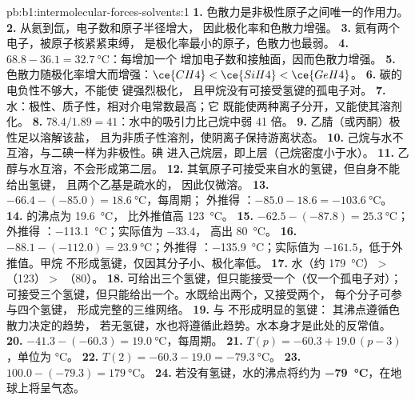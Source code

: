 \begin{solution}{pb:b1:intermolecular-forces-solvents:1}
\textbf{1.} 色散力是非极性原子之间唯一的作用力。
\textbf{2.} 从氦到氙，电子数和原子半径增大，
因此极化率和色散力增强。
\textbf{3.} 氦有两个电子，被原子核紧紧束缚，
是极化率最小的原子，色散力也最弱。
\textbf{4.} $68.8 - 36.1 = \qty{32.7}{\celsius}$：每增加一个 
增加电子数和接触面，因而色散力增强。
\textbf{5.} 色散力随极化率增大而增强：$\ce{CH4} < \ce{SiH4} <
\ce{GeH4}$。
\textbf{6.} 碳的电负性不够大，不能使  键强烈极化，
且甲烷没有可接受氢键的孤电子对。
\textbf{7.} 水：极性、质子性，相对介电常数最高；它
既能使两种离子分开，又能使其溶剂化。
\textbf{8.} $78.4/1.89 = 41$：水中的吸引力比己烷中弱 41 倍。
\textbf{9.} 乙腈（或丙酮）极性足以溶解该盐，
且为非质子性溶剂，使阴离子保持游离状态。
\textbf{10.} 己烷与水不互溶，与二碘一样为非极性。碘
进入己烷层，即上层（己烷密度小于水）。
\textbf{11.} 乙醇与水互溶，不会形成第二层。
\textbf{12.} 其氧原子可接受来自水的氢键，但自身不能给出氢键，
且两个乙基是疏水的，
因此仅微溶。
\textbf{13.} $-66.4 - (-85.0) = \qty{18.6}{\celsius}$，每周期；
外推得 ：$-85.0 - 18.6 = \qty{-103.6}{\celsius}$。
\textbf{14.}  的沸点为 \qty{19.6}{\celsius}，
比外推值高 \qty{123}{\celsius}。
\textbf{15.} $-62.5 - (-87.8) = \qty{25.3}{\celsius}$；外推得
：\qty{-113.1}{\celsius}；实际值为 $-33.4$，
高出 \qty{80}{\celsius}。
\textbf{16.} $-88.1 - (-112.0) = \qty{23.9}{\celsius}$；外推得
：\qty{-135.9}{\celsius}；实际值为 $-161.5$，低于外推值。甲烷
不形成氢键，仅因其分子小、极化率低。
\textbf{17.} 水（约 \qty{179}{\celsius}）$>$ （123）$>$
（80）。
\textbf{18.}  可给出三个氢键，但只能接受一个（仅一个孤电子对）；
 可接受三个氢键，但只能给出一个。水既给出两个，又接受两个，
每个分子可参与四个氢键，
形成完整的三维网络。
\textbf{19.}  与  不形成明显的氢键：
其沸点遵循色散力决定的趋势，
若无氢键，水也将遵循此趋势。水本身才是此处的反常值。
\textbf{20.} $-41.3 - (-60.3) = \qty{19.0}{\celsius}$，每周期。
\textbf{21.} $T(p) = -60.3 + 19.0\,(p - 3)$，单位为 \unit{\celsius}。
\textbf{22.} $T(2) = -60.3 - 19.0 = \qty{-79.3}{\celsius}$。
\textbf{23.} $100.0 - (-79.3) = \qty{179}{\celsius}$。
\textbf{24.} 若没有氢键，水的沸点将约为
\textbf{\qty{-79}{\celsius}}，在地球上将呈气态。
\end{solution}
